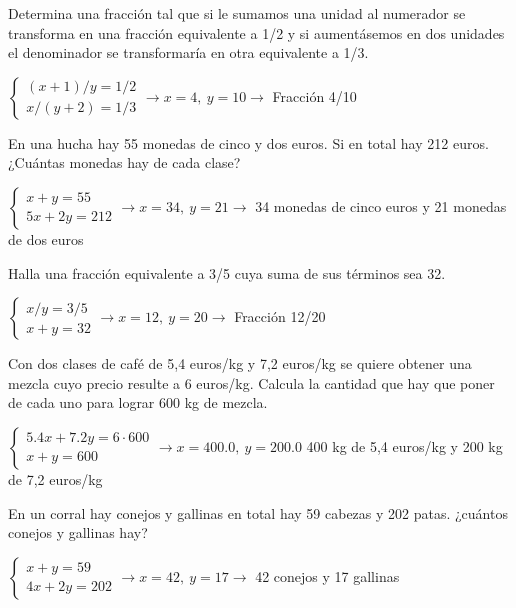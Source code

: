 \documentclass[spanish, 12pt]{exam}
\begin{document}
\begin{questions}
\question Determina una fracción tal que si le sumamos una unidad al numerador se transforma en una fracción equivalente a 1/2 y si aumentásemos en dos unidades el denominador se transformaría en otra equivalente a 1/3.

\begin{solution} $\left\{\begin{matrix}(x+1)/y=1/2 \\ x/(y+2)=1/3\end{matrix}\right. \to  x = 4, \  y = 10 \to$ Fracción 4/10 \end{solution}

\question En una hucha hay 55 monedas de cinco y dos euros. Si en total hay 212 euros. ¿Cuántas monedas hay de cada clase?
\begin{solution} $\left\{\begin{matrix}x+y=55 \\ 5x+2y=212\end{matrix}\right. \to  x = 34, \  y = 21 \to$ 34 monedas de cinco euros y 21 monedas de dos euros \end{solution}

\question Halla una fracción equivalente a 3/5 cuya suma de sus términos sea 32.
\begin{solution} $\left\{\begin{matrix}x/y=3/5 \\ x+y=32\end{matrix}\right. \to  x = 12, \  y = 20 \to$ Fracción 12/20 \end{solution}

\question Con dos clases de café de 5,4 euros/kg y 7,2 euros/kg se quiere obtener una mezcla cuyo precio resulte a 6 euros/kg. Calcula la cantidad que hay que poner de cada uno para lograr 600 kg de mezcla.

\begin{solution} \to$\left\{\begin{matrix}5.4x+7.2y=6 \cdot 600 \\ x+y=600\end{matrix}\right. \to  x = 400.0, \  y = 200.0 $ 400 kg de 5,4 euros/kg y 200 kg de 7,2 euros/kg \end{solution}

\question En un corral hay conejos y gallinas en total hay 59 cabezas y 202 patas. ¿cuántos conejos y gallinas hay?
\begin{solution} $\left\{\begin{matrix}x+y=59 \\ 4x+2y=202\end{matrix}\right. \to  x = 42, \  y = 17 \to$ 42 conejos y 17 gallinas \end{solution}


\end{questions}
\end{document}
